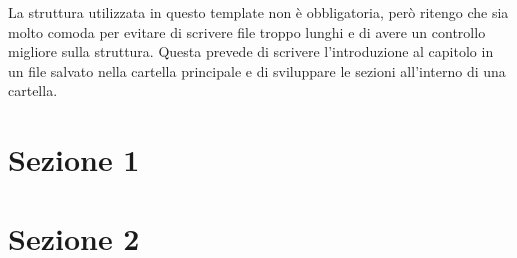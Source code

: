 La struttura utilizzata in questo template non è obbligatoria, però ritengo che sia molto comoda per evitare di scrivere file troppo lunghi e di avere un controllo migliore sulla struttura. Questa prevede di scrivere l'introduzione al capitolo in un file salvato nella cartella principale e di sviluppare le sezioni all'interno di una cartella.

\section{Sezione 1}


\section{Sezione 2}

